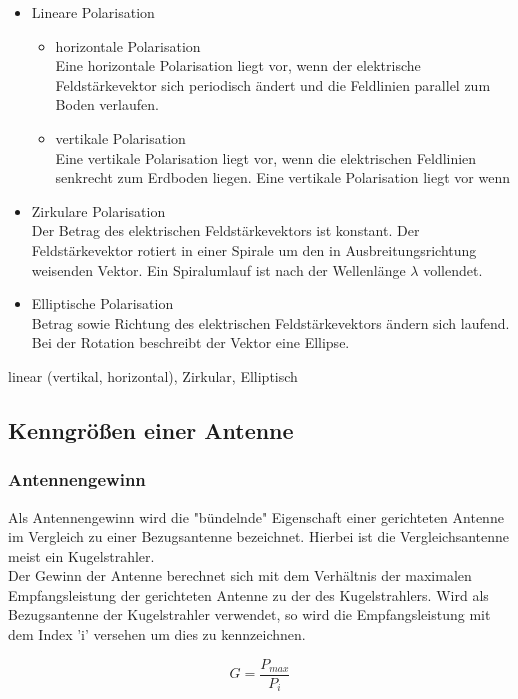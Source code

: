 \documentclass[12pt]{scrreprt}
\begin{document}
	
	\begin{itemize}
		\item Lineare Polarisation
		\begin{itemize}
			\item horizontale Polarisation\\
			Eine horizontale Polarisation liegt vor, wenn der elektrische Feldstärkevektor sich periodisch ändert und die Feldlinien parallel zum Boden verlaufen.
			\item vertikale Polarisation\\
			Eine vertikale Polarisation liegt vor, wenn die elektrischen Feldlinien senkrecht zum Erdboden liegen.
			Eine vertikale Polarisation liegt vor wenn
		\end{itemize}
		\item Zirkulare Polarisation\\
		Der Betrag des elektrischen Feldstärkevektors ist konstant. Der Feldstärkevektor rotiert in einer Spirale um den in Ausbreitungsrichtung weisenden Vektor. Ein Spiralumlauf ist nach der Wellenlänge $\lambda$ vollendet.
		\item Elliptische Polarisation\\
		Betrag sowie Richtung des elektrischen Feldstärkevektors ändern sich laufend. Bei der Rotation beschreibt der Vektor eine Ellipse.
	\end{itemize}
	linear (vertikal, horizontal), Zirkular, Elliptisch
	
	\subsection{Kenngrößen einer Antenne}
	
	\subsubsection{Antennengewinn}
	Als Antennengewinn wird die "bündelnde" Eigenschaft einer gerichteten Antenne im Vergleich zu einer Bezugsantenne bezeichnet. Hierbei ist die Vergleichsantenne meist ein Kugelstrahler.\\
	
	
	Der Gewinn der Antenne berechnet sich mit dem Verhältnis der maximalen Empfangsleistung der gerichteten Antenne zu der des Kugelstrahlers. Wird als Bezugsantenne der Kugelstrahler verwendet, so wird die Empfangsleistung mit dem Index 'i' versehen um dies zu kennzeichnen.
	
	\begin{equation}
		G=\frac{P_{max}}{P_{i}}
	\end{equation}
	
\end{document}
